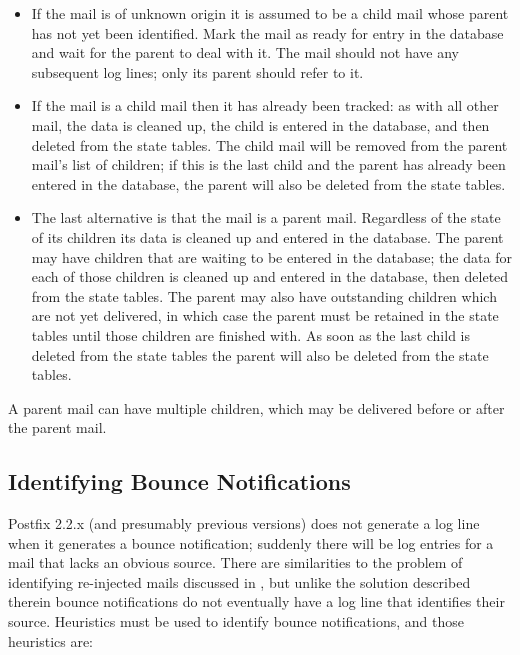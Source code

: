 \begin{itemize}

    \item If the mail is of unknown origin it is assumed to be a child mail
        whose parent has not yet been identified.  Mark the mail as ready
        for entry in the database and wait for the parent to deal with it.
        The mail should not have any subsequent log lines; only its parent
        should refer to it.

    \item If the mail is a child mail then it has already been tracked: as
        with all other mail, the data is cleaned up, the child is entered
        in the database, and then deleted from the state tables.  The child
        mail will be removed from the parent mail's list of children; if
        this is the last child and the parent has already been entered in
        the database, the parent will also be deleted from the state
        tables.

    \item The last alternative is that the mail is a parent mail.
        Regardless of the state of its children its data is cleaned up and
        entered in the database.  The parent may have children that are
        waiting to be entered in the database; the data for each of those
        children is cleaned up and entered in the database, then deleted
        from the state tables.  The parent may also have outstanding
        children which are not yet delivered, in which case the parent must
        be retained in the state tables until those children are finished
        with.  As soon as the last child is deleted from the state tables
        the parent will also be deleted from the state tables.

\end{itemize}

A parent mail can have multiple children, which may be delivered before or
after the parent mail.


\subsection{Identifying Bounce Notifications}

\label{identifying bounce notifications}

Postfix 2.2.x (and presumably previous versions) does not generate a log
line when it generates a bounce notification; suddenly there will be log
entries for a mail that lacks an obvious source.  There are similarities to
the problem of identifying re-injected mails discussed in
, but unlike the solution described
therein bounce notifications do not eventually have a log line that
identifies their source.  Heuristics must be used to identify bounce
notifications, and those heuristics are:

